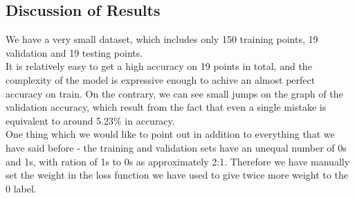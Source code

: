 \documentclass[11pt, oneside]{article}   	%
\begin{document}
\subsection{Discussion of Results}
We have a very small dataset, which includes only 150 training points, 19 validation and 19 testing points.\\
It is relatively easy to get a high accuracy on 19 points in total, and the complexity of the model is expressive enough to achive an almost perfect accuracy on train. On the contrary, we can see small jumps on the graph of the validation accuracy, which result from the fact that even a single mistake is equivalent to around 5.23\% in accuracy.\\

One thing which we would like to point out in addition to everything that we have said before - the training and validation sets have an unequal number of 0s and 1s, with ration of 1s to 0s as approximately 2:1. Therefore we have manually set the weight in the loss function we have used to give twice more weight to the 0 label.
\end{document}
